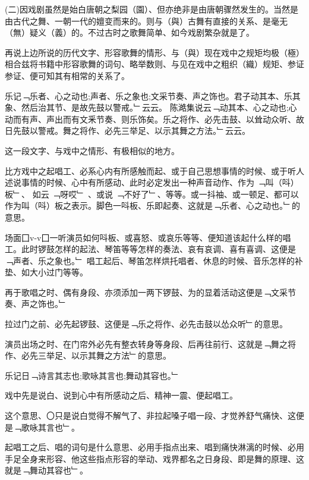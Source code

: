 \documentclass{zhvt-classic}
\begin{document}
(二)因戏剧虽然是始白唐朝之梨园（園）、但亦绝非是由唐朝骤然发生的。当然是由古代之舞、一朝一代的嬗变而来的。则与（與）古舞有直接的关系、是毫无（無）疑义（義）的。不过古时之歌舞简单、如今戏剧繁杂就是了。

再说上边所说的历代文字、形容歌舞的情形、与（與）现在戏中之规矩均极（極）相合兹将书籍中形容歌舞的词句、略举数则、与见在戏中之粗织（織）规矩、参证参证、便可知其有相常的关系了。

\begin{preface}
  乐记﹁乐者、心之动也;声者、乐之象也;文采节奏、声之饰也。君子动其本、乐其象、然后治其节、是故先鼓以警戒。﹂云云。
  陈澔集说云﹁动其本、心之动也;心动而有声、声出而有文釆节奏、则乐饰矣。乐之将作、必先击鼓、以耸动众听、故日先鼓以警戒。舞之将作、必先三举足、以示其舞之方法。﹂云云。
\end{preface}

这一段文字、与戏中之情形、有极相似的地方。

比方戏中之起唱工、必系心内有所感触而起、或于自己思想事情的时候、或于听人述说事情的时候、心中有所感动、此时必定发出一种声音动作、作为 ﹁叫（呌）板﹂、 如云 ﹁呀哎﹂ 、或说 ﹁不好了﹂、等等。或一抖袖、或一顿足、都可以作为叫（呌）板之表示。脚色一呌板、乐即起奏、这就是﹁乐者、心之动也。﹂的意思。

场面囗v-v囗一听演员如何呌板、或喜怒、或哀乐等等、便知道该起什么样的唱工。此时锣鼓怎样的起法、琴笛等等怎样的奏法、哀有哀调、喜有喜调、这便是﹁声者、乐之象也。﹂ 唱工起后、琴笛怎样烘托唱者、休息的时候、音乐怎样的补垫、如大小过门等等。

再于歌唱之时、偶有身段、亦须添加一两下锣鼓、为的显着活动这便是﹁文采节奏、声之饰也。﹂

拉过门之前、必先起锣鼓、这便是﹁乐之将作、必先击鼓以怂众听﹂的意思。

演员出场之时、在门帘外必先有整衣转身等身段、后再往前行、这就是﹁舞之将作、必先三举足、以示其舞之方法﹂的意思。

\begin{preface}
  乐记日﹁诗言其志也;歌咏其言也;舞动其容也。﹂
\end{preface}

戏中先是说白、说到心中有所感动之后、精神一震、便起唱工。

这个意思、〇只是说白觉得不解气了、非拉起嗓子唱一段、才觉养舒气痛快、这便是﹁歌咏其言也﹂。

起唱工之后、唱的词句是什么意思、必用手指点出来、唱到痛快淋漓的时候、必用手足全身来形容、他这些指点形容的举动、戏界都名之日身段、即是舞的原理、这就是﹁舞动其容也﹂。
\end{document}
